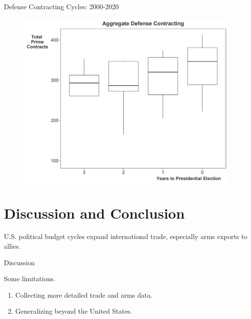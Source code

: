 \documentclass[12pt]{beamer}
\begin{document}
\begin{frame}{Defense Contracting Cycles: 2000-2020}

\begin{figure}[htbp]
	\centering
		\includegraphics[height=.90\textheight]{contract-cycles.png}
\end{figure}


\end{frame}






\section{Discussion and Conclusion} 



\begin{frame}[standout]

U.S. political budget cycles expand international trade, especially arms exports to allies.  

\end{frame}


\begin{frame}{Discussion}

Some limitations. 

\pause
\begin{enumerate}
\item Collecting more detailed trade and arms data. 
\pause
\item Generalizing beyond the United States. 
\end{enumerate} 

\end{frame}
\end{document}
